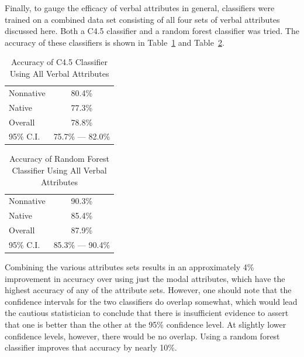 \documentclass[main.tex]{subfiles}
\begin{document}
Finally, to gauge the efficacy of verbal attributes in general, classifiers were trained on a combined data set consisting of all four sets of verbal attributes discussed here. Both a C4.5 classifier and a random forest classifier was tried. The accuracy of these classifiers is shown in Table~\ref{table:c45-combined-results} and Table~\ref{table:combined-results}.
\begin{table}[htbp]
\centering
\caption{Accuracy of C4.5 Classifier Using All Verbal Attributes}
\begin{tabular}{l c}
\toprule
Nonnative & 80.4\% \\
Native & 77.3\% \\
Overall & 78.8\% \\ 
95\% C.I. & 75.7\% --- 82.0\%\\
\bottomrule
\end{tabular}
\label{table:c45-combined-results}
\end{table}
\begin{table}[htbp]
\centering
\caption{Accuracy of Random Forest Classifier Using All Verbal Attributes}
\begin{tabular}{l c}
\toprule
Nonnative & 90.3\% \\
Native & 85.4\% \\
Overall & 87.9\% \\
95\% C.I. & 85.3\% --- 90.4\%\\
\bottomrule
\end{tabular}
\label{table:combined-results}
\end{table}
Combining the various attributes sets results in an approximately 4\% improvement in accuracy over using just the modal attributes, which have the highest accuracy of any of the attribute sets. However, one should note that the confidence intervals for the two classifiers do overlap somewhat, which would lead the cautious statistician to conclude that there is insufficient evidence to assert that one is better than the other at the 95\% confidence level. At slightly lower confidence levels, however, there would be no overlap. Using a random forest classifier improves that accuracy by nearly 10\%.
\biblio
\end{document}
